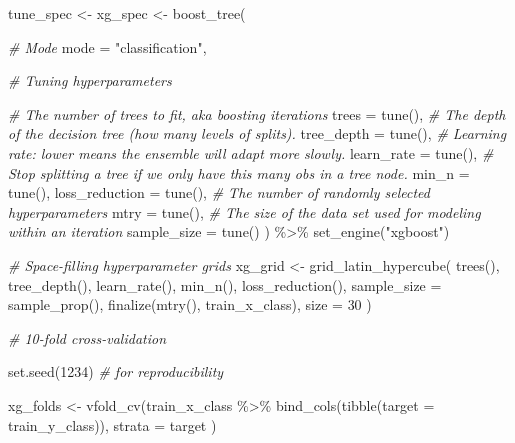 \documentclass[
]{book}
\newenvironment{Shaded}{\begin{snugshade}}{\end{snugshade}}
\newcommand{\AttributeTok}[1]{\textcolor[rgb]{0.77,0.63,0.00}{#1}}
\newcommand{\CommentTok}[1]{\textcolor[rgb]{0.56,0.35,0.01}{\textit{#1}}}
\newcommand{\DecValTok}[1]{\textcolor[rgb]{0.00,0.00,0.81}{#1}}
\newcommand{\FunctionTok}[1]{\textcolor[rgb]{0.00,0.00,0.00}{#1}}
\newcommand{\NormalTok}[1]{#1}
\newcommand{\OtherTok}[1]{\textcolor[rgb]{0.56,0.35,0.01}{#1}}
\newcommand{\SpecialCharTok}[1]{\textcolor[rgb]{0.00,0.00,0.00}{#1}}
\newcommand{\StringTok}[1]{\textcolor[rgb]{0.31,0.60,0.02}{#1}}
\begin{document}
\begin{Shaded}
\begin{Highlighting}[]
\NormalTok{tune\_spec }\OtherTok{\textless{}{-}}
\NormalTok{  xg\_spec }\OtherTok{\textless{}{-}} \FunctionTok{boost\_tree}\NormalTok{(}

    \CommentTok{\# Mode}
    \AttributeTok{mode =} \StringTok{"classification"}\NormalTok{,}

    \CommentTok{\# Tuning hyperparameters}

    \CommentTok{\# The number of trees to fit, aka boosting iterations}
    \AttributeTok{trees =} \FunctionTok{tune}\NormalTok{(),}
    \CommentTok{\# The depth of the decision tree (how many levels of splits).}
    \AttributeTok{tree\_depth =} \FunctionTok{tune}\NormalTok{(),}
    \CommentTok{\# Learning rate: lower means the ensemble will adapt more slowly.}
    \AttributeTok{learn\_rate =} \FunctionTok{tune}\NormalTok{(),}
    \CommentTok{\# Stop splitting a tree if we only have this many obs in a tree node.}
    \AttributeTok{min\_n =} \FunctionTok{tune}\NormalTok{(),}
    \AttributeTok{loss\_reduction =} \FunctionTok{tune}\NormalTok{(),}
    \CommentTok{\# The number of randomly selected hyperparameters}
    \AttributeTok{mtry =} \FunctionTok{tune}\NormalTok{(),}
    \CommentTok{\# The size of the data set used for modeling within an iteration}
    \AttributeTok{sample\_size =} \FunctionTok{tune}\NormalTok{()}
\NormalTok{  ) }\SpecialCharTok{\%\textgreater{}\%}
  \FunctionTok{set\_engine}\NormalTok{(}\StringTok{"xgboost"}\NormalTok{)}

\CommentTok{\# Space{-}filling hyperparameter grids}
\NormalTok{xg\_grid }\OtherTok{\textless{}{-}} \FunctionTok{grid\_latin\_hypercube}\NormalTok{(}
  \FunctionTok{trees}\NormalTok{(),}
  \FunctionTok{tree\_depth}\NormalTok{(),}
  \FunctionTok{learn\_rate}\NormalTok{(),}
  \FunctionTok{min\_n}\NormalTok{(),}
  \FunctionTok{loss\_reduction}\NormalTok{(),}
  \AttributeTok{sample\_size =} \FunctionTok{sample\_prop}\NormalTok{(),}
  \FunctionTok{finalize}\NormalTok{(}\FunctionTok{mtry}\NormalTok{(), train\_x\_class),}
  \AttributeTok{size =} \DecValTok{30}
\NormalTok{)}

\CommentTok{\# 10{-}fold cross{-}validation}

\FunctionTok{set.seed}\NormalTok{(}\DecValTok{1234}\NormalTok{) }\CommentTok{\# for reproducibility}

\NormalTok{xg\_folds }\OtherTok{\textless{}{-}} \FunctionTok{vfold\_cv}\NormalTok{(train\_x\_class }\SpecialCharTok{\%\textgreater{}\%} \FunctionTok{bind\_cols}\NormalTok{(}\FunctionTok{tibble}\NormalTok{(}\AttributeTok{target =}\NormalTok{ train\_y\_class)),}
  \AttributeTok{strata =}\NormalTok{ target}
\NormalTok{)}
\end{Highlighting}
\end{Shaded}
\end{document}
